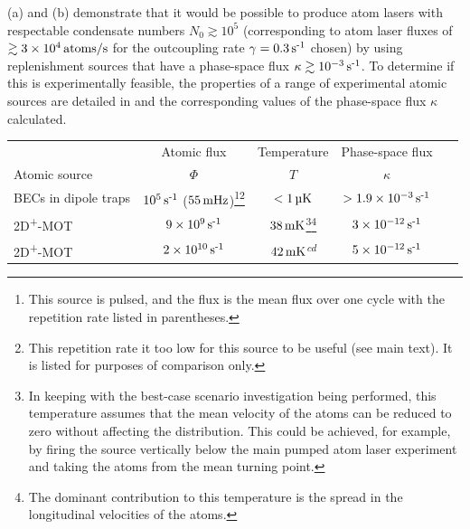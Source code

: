 (a) and (b) demonstrate that it would be possible to produce atom lasers with respectable condensate numbers $N_0 \gtrsim 10^5$ (corresponding to atom laser fluxes of $\gtrsim\unit[3\times 10^4]{atoms/s}$ for the outcoupling rate $\gamma = \unit[0.3]{s\textsuperscript{-1}}$ chosen) by using replenishment sources that have a phase-space flux $\kappa \gtrsim \unit[10^{-3}]{s\textsuperscript{-1}}$.  To determine if this is experimentally feasible, the properties of a range of experimental atomic sources are detailed in  and the corresponding values of the phase-space flux $\kappa$ calculated.

\begin{table}
    \begin{minipage}{\textwidth}
        \renewcommand{\footnoterule}{}
        \centering
        \begin{tabular}{ p{3.563cm} c c c r}
        \toprule
         & Atomic flux   & Temperature  & Phase-space flux  &\\
        Atomic source &  $\Phi$  &  $T$ &  $\kappa$ &\\
        \midrule
        BECs in dipole traps & $\unit[10^5]{s\textsuperscript{-1}}$ ($\unit[55]{mHz}$)\footnote{This source is pulsed, and the flux is the mean flux over one cycle with the repetition rate listed in parentheses.}\footnote{This repetition rate it too low for this source to be useful (see main text). It is listed for purposes of comparison only.} & $<\unit[1]{\micro K}$ & $>\unit[1.9\times 10^{-3}]{s\textsuperscript{-1}}$ &~\citep{Chikkatur:2002qa} \\
        2D\textsuperscript{+}-MOT & $\unit[9\times 10^{9}]{s\textsuperscript{-1}}$ & $\unit[38]{mK}$\footnote{In keeping with the best-case scenario investigation being performed, this temperature assumes that the mean velocity of the atoms can be reduced to zero without affecting the distribution. This could be achieved, for example, by firing the source vertically below the main pumped atom laser experiment and taking the atoms from the mean turning point.}\footnote{The dominant contribution to this temperature is the spread in the longitudinal velocities of the atoms.} & $\unit[3 \times 10^{-12}]{s\textsuperscript{-1}}$ &~\citep{Dieckmann:1998} \\
        2D\textsuperscript{+}-MOT & $\unit[2\times 10^{10}]{s\textsuperscript{-1}}$ & $\unit[42]{mK}$\textsuperscript{\emph{cd}} & $\unit[5 \times 10^{-12}]{s\textsuperscript{-1}}$ &~\citep{Chaudhuri:2006} \\

\end{tabular}
\end{minipage}
\end{table}
